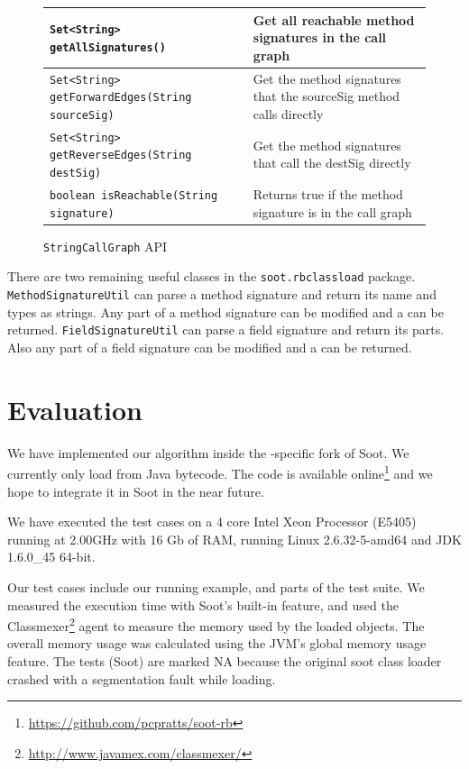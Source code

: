 \documentclass{sigplanconf}
\begin{document}
\begin{figure}[htbf]
\begin{tabularx}{\columnwidth}{|XX|}
\hline
{\tt Set<String> getAllSignatures()} & Get all reachable method 
    signatures in the call graph\\\hline 
{\tt Set<String> getForwardEdges(String sourceSig)} & Get the
    method signatures that the sourceSig method calls directly\\\hline  
{\tt Set<String> getReverseEdges(String destSig)} & Get the
    method signatures that call the destSig directly\\\hline
{\tt boolean isReachable(String signature)} & Returns true if the
    method signature is in the call graph\\\hline
\end{tabularx}
\caption{{\tt StringCallGraph} API}
\label{fig:scg}
\end{figure}

There are two remaining useful classes in the {\tt soot.\-rbclassload} package. {\tt MethodSignatureUtil} can parse a method signature and return its name and types as strings. Any part of a method signature can be modified and a \sootmethod can be returned. {\tt FieldSignatureUtil} can parse a field signature and return its parts. Also any part of a field signature can be modified and a \sootfield can be returned.

\section{Evaluation}
\label{sec:eval}

We have implemented our algorithm inside the \rb{}-specific fork of Soot. We currently only load from Java bytecode. The code is available online\footnote{\url{https://github.com/pcpratts/soot-rb}} and we hope to integrate it in Soot in the near future.

We have executed the test cases on a 4 core Intel Xeon Processor (E5405) running at 2.00GHz with 16 Gb of RAM, running Linux 2.6.32-5-amd64 and JDK 1.6.0\_45 64-bit. 

Our test cases include our running example, and parts of the \rb test suite. We measured the execution time with Soot's built-in feature, and used the Classmexer\footnote{\url{http://www.javamex.com/classmexer/}} agent to measure the memory used by the loaded \sootclass objects. The overall memory usage was calculated using the JVM's global memory usage feature. The \rb tests (Soot) are marked NA because the original soot class loader crashed with a segmentation fault while loading.
\end{document}
